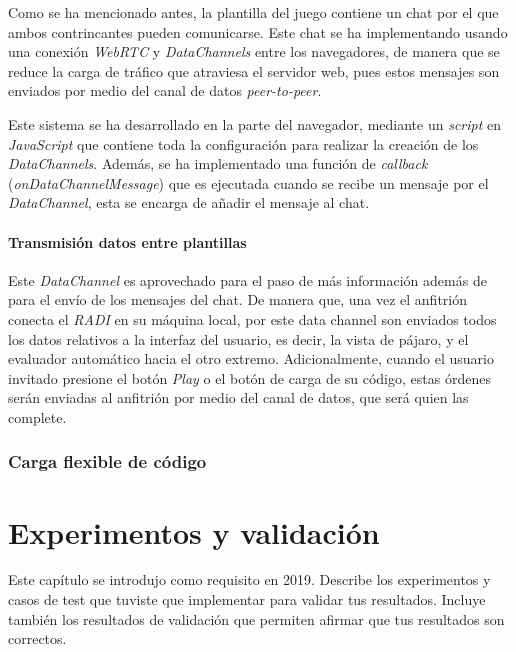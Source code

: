 \documentclass[a4paper, 12pt]{book}
\begin{document}
Como se ha mencionado antes, la plantilla del juego contiene un chat por el que ambos contrincantes pueden comunicarse. Este chat se ha implementando usando una conexión \emph{WebRTC} y \emph{DataChannels} entre los navegadores, de manera que se reduce la carga de tráfico que atraviesa el servidor web, pues estos mensajes son enviados por medio del canal de datos \emph{peer-to-peer}.

Este sistema se ha desarrollado en la parte del navegador, mediante un \emph{script} en \emph{JavaScript} que contiene toda la configuración para realizar la creación de los \emph{DataChannels}. Además, se ha implementado una función de \emph{callback} (\emph{onDataChannelMessage}) que es ejecutada cuando se recibe un mensaje por el \emph{DataChannel}, esta se encarga de añadir el mensaje al chat.

\subsubsection{Transmisión datos entre plantillas}

Este \emph{DataChannel} es aprovechado para el paso de más información además de para el envío de los mensajes del chat. De manera que, una vez el anfitrión conecta el \emph{RADI} en su máquina local, por este data channel son enviados todos los datos relativos a la interfaz del usuario, es decir, la vista de pájaro, y el evaluador automático hacia el otro extremo. Adicionalmente, cuando el usuario invitado presione el botón \emph{Play} o el botón de carga de su código, estas órdenes serán enviadas al anfitrión por medio del canal de datos, que será quien las complete.

\subsection{Carga flexible de código}



\cleardoublepage
\chapter{Experimentos y validación}

Este capítulo se introdujo como requisito en 2019. 
Describe los experimentos y casos de test que tuviste que implementar para validar tus resultados. 
Incluye también los resultados de validación que permiten afirmar que tus resultados son correctos. 
\end{document}
